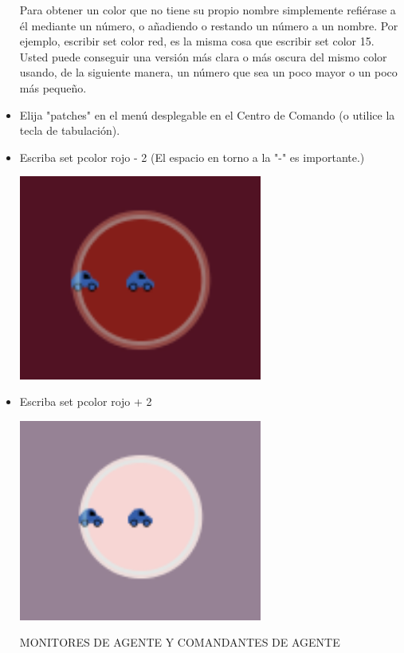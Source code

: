 \documentclass[12pt,letterpaper]{article}
\begin{document}
\begin{itemize}
Para obtener un color que no tiene su propio nombre simplemente refiérase a él mediante un número, o añadiendo o restando un número a un nombre. Por ejemplo, escribir set color red, es la misma cosa que escribir set color 15. Usted puede conseguir una versión más clara o más oscura del mismo color usando, de la siguiente manera, un número que sea un poco mayor o un poco más pequeño.

\item Elija "patches" en el menú desplegable en el Centro de Comando (o utilice la tecla de tabulación).
\item Escriba set pcolor rojo - 2 (El espacio en torno a la "-" es importante.)

\begin{center}
	\includegraphics[width=8cm]{./imagenes/image9.png}
\end{center}

\item Escriba set pcolor rojo + 2

\begin{center}
	\includegraphics[width=8cm]{./imagenes/image10.png}
\end{center}

\begin{center}
	MONITORES DE AGENTE Y COMANDANTES DE AGENTE
\end{center}


\end{itemize}
\end{document}

